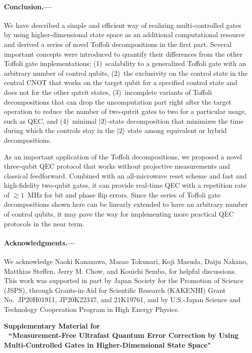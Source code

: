 \documentclass[aps,prl,twocolumn,groupedaddress,superscriptaddress]{revtex4}
\begin{document}
\paragraph{Conclusion.---}
We have described a simple and efficient way of realizing multi-controlled gates by using higher-dimensional state space as an additional computational resource and derived a series of novel Toffoli decompositions in the first part.
Several important concepts were introduced to quantify their differences from the other Toffoli gate implementations;
(1)~scalability to a generalized Toffoli gate with an arbitrary number of control qubits,
(2)~the exclusivity on the control state in the central CNOT that works on the target qubit for a specified control state and does not for the other qutrit states,
(3)~incomplete variants of Toffoli decompositions that can drop the uncomputation part right after the target operation to reduce the number of two-qutrit gates to two for a particular usage, such as QEC, and
(4)~minimal $\ket{2}$-state decomposition that minimizes the time during which the controls stay in the $\ket{2}$ state among equivalent or hybrid decompositions.

As an important application of the Toffoli decompositions, we proposed a novel three-qubit QEC protocol that works without projective measurements and classical feedforward.
Combined with an all-microwave reset scheme and fast and high-fidelity two-qubit gates, it can provide real-time QEC with a repetition rate of $\gtrsim1$~MHz for bit and phase flip errors.
Since the series of Toffoli gate decompositions shown here can be linearly extended to have an arbitrary number of control qubits, it may pave the way for implementing more practical QEC protocols in the near term.

\paragraph{Acknowledgments.---}
We acknowledge
Naoki Kanazawa,
Masao Tokunari,
Koji Masuda,
Daiju Nakano,
Matthias Steffen,
Jerry M. Chow,
and Kouichi Semba,
for helpful discussions.
This work was supported in part by Japan Society for the Promotion of Science (JSPS), through Grants-in-Aid for Scientific Research (KAKENHI) Grant No.~JP20H01911, JP20K22347, and 21K19761, and by
U.S.-Japan Science and Technology Cooperation Program in High Energy Physics.



\clearpage

\onecolumngrid
\begin{center}
    \textbf{\large Supplementary Material for\\ 
$\;$\\ $\;$
``Measurement-Free Ultrafast Quantum Error Correction by Using Multi-Controlled Gates in Higher-Dimensional State Space"}
\end{center}
\bigskip


\end{document}
